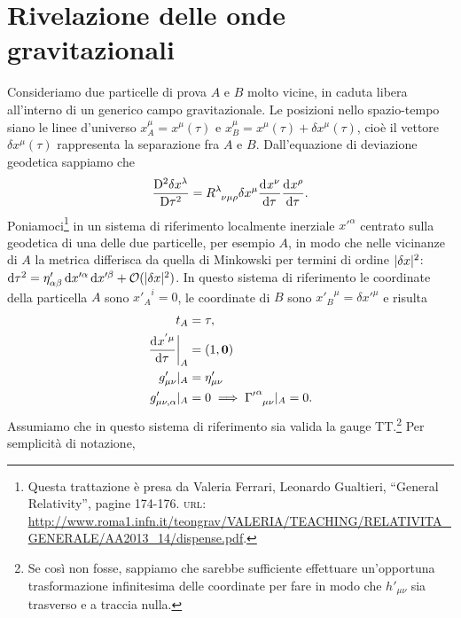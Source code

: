\section{Rivelazione delle onde gravitazionali}
\label{sec:rivelazione-onde}

Consideriamo due particelle di prova $A$ e $B$ molto vicine, in caduta libera
all'interno di un generico campo gravitazionale.  Le posizioni nello
spazio-tempo siano le linee d'universo $x^{\mu}_{A} = x^{\mu}(\tau)$ e
$x^{\mu}_{B} = x^{\mu}(\tau) + \delta x^{\mu}(\tau)$, cioè il vettore $\delta
x^{\mu}(\tau)$ rappresenta la separazione fra $A$ e $B$.  Dall'equazione di
deviazione geodetica sappiamo che
\begin{equation}
  \label{eq:onde-grav-dev-geo}
  \curder[2]{\delta x^{\lambda}} = \tensor{R}{^{\lambda}_{\nu\mu\rho}} \delta
  x^{\mu} \toder{x^{\nu}}{\tau} \toder{x^{\rho}}{\tau}.
\end{equation}
Poniamoci\footnote{Questa trattazione è presa da Valeria Ferrari, Leonardo
  Gualtieri, ``General Relativity'', pagine 174-176.  \textsc{url}:
  \url{http://www.roma1.infn.it/teongrav/VALERIA/TEACHING/RELATIVITA_GENERALE/AA2013_14/dispense.pdf}.}
in un sistema di riferimento localmente inerziale $x'^{\alpha}$ centrato sulla
geodetica di una delle due particelle, per esempio $A$, in modo che nelle
vicinanze di $A$ la metrica differisca da quella di Minkowski per termini di
ordine $\lvert\delta x\rvert^{2}$: $\mathop{}\!\mathrm{d} \tau^{2} = \eta'_{\alpha \beta}\mathop{}\!\mathrm{d}
x'^{\alpha}\mathop{}\!\mathrm{d} x'^{\beta} + \mathcal{O}(\lvert\delta x\rvert^{2})$.  In questo sistema
di riferimento le coordinate della particella $A$ sono ${x'_{A}}^{i} = 0$, le
coordinate di $B$ sono ${x'_{B}}^{\mu} = \delta x'^{\mu}$ e risulta
\begin{subequations}
  \begin{align}
    t_{A} &= \tau, \\
    \label{eq:foo-geodetica-A}
    \toder{x^{' \mu}}{\tau}\bigg|_{A} &= (1, \bm{0}) \\
    g'_{\mu \nu}|_{A} &= \eta'_{\mu\nu} \\
    g'_{\mu\nu,\alpha}|_{A} &= 0 \implies
    \tensor{{\Gamma'}}{^{\alpha}_{\mu\nu}}|_{A} = 0.
  \end{align}
\end{subequations}
Assumiamo che in questo sistema di riferimento sia valida la gauge
TT.\footnote{Se così non fosse, sappiamo che sarebbe sufficiente effettuare
  un'opportuna trasformazione infinitesima delle coordinate per fare in modo che
  $h'_{\mu\nu}$ sia trasverso e a traccia nulla.}  Per semplicità di notazione,
